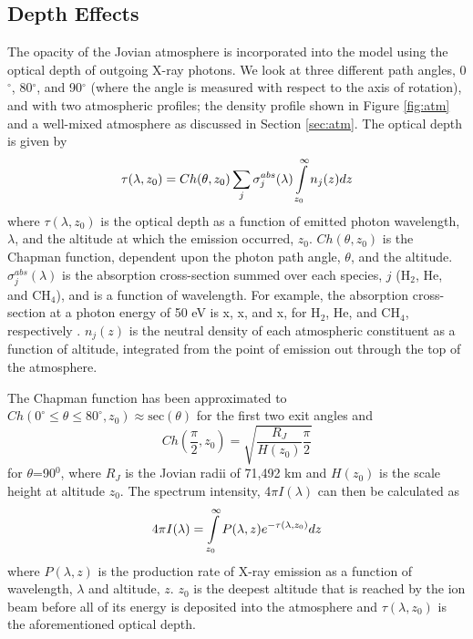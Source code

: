 \documentclass[draft]{agujournal2018}
\begin{document}
\subsection{Depth Effects}

The opacity of the Jovian atmosphere is incorporated into the model using the optical depth of outgoing X-ray photons.
We look at three different path angles, 0$^{\circ}$, 80$^{\circ}$, and 90$^{\circ}$ (where the angle is measured with respect to the axis of rotation), and with two atmospheric profiles; the density profile shown in Figure \ref{fig:atm} and a well-mixed atmosphere as discussed in Section \ref{sec:atm}.
The optical depth is given by
\begin{equation}
    \tau(\lambda,z_{0})=Ch(\theta,z_{0})\sum_{j}\sigma_{j}^{abs}(\lambda)\int\displaylimits_{z_{0}}^{\infty}n_{j}(z)dz
    \label{eqn:tau}
\end{equation}
where $\tau(\lambda,z_{0})$ is the optical depth as a function of emitted photon wavelength, $\lambda$, and the altitude at which the emission occurred, $z_{0}$.
$Ch(\theta,z_{0})$ is the Chapman function, dependent upon the photon path angle, $\theta$, and the altitude.
$\sigma_j^{abs}(\lambda)$ is the absorption cross-section summed over each species, $j$ (H$_2$, He, and CH$_4$), and is a function of wavelength.
For example, the absorption cross-section at a photon energy of 50 eV is x, x, and x, for H$_2$, He, and CH$_4$, respectively \citep{cravens1995}.
$n_j(z)$ is the neutral density of each atmospheric constituent as a function of altitude, integrated from the point of emission out through the top of the atmosphere.

The Chapman function has been approximated to $Ch(0^{\circ} \leq \theta \leq 80^{\circ},z_{0}) \approx \mathrm{sec}(\theta)$ for the first two exit angles and
\begin{equation}
    Ch(\frac{\pi}{2},z_{0})=\sqrt{\frac{R_J}{H(z_0)}\frac{\pi}{2}}
    \label{eqn:Chap}
\end{equation}
for $\theta$=90$^{0}$, where $R_J$ is the Jovian radii of 71,492 km and $H(z_0)$ is the scale height at altitude $z_0$.
The spectrum intensity, 4$\pi I(\lambda)$ can then be calculated as
\begin{equation}
    4\pi I(\lambda)=\int\displaylimits_{z_0}^{\infty}P(\lambda,z)e^{-\tau(\lambda,z_0)}dz
    \label{eqn:I}
\end{equation}
where $P(\lambda,z)$ is the production rate of X-ray emission as a function of wavelength, $\lambda$ and altitude, $z$.
$z_0$ is the deepest altitude that is reached by the ion beam before all of its energy is deposited into the atmosphere and $\tau(\lambda,z_0)$ is the aforementioned optical depth.
\end{document}

